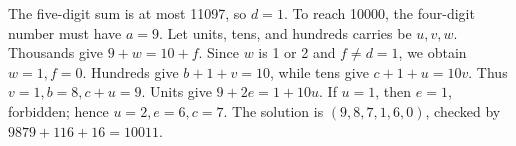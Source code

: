 The five-digit sum is at most 11097, so $d=1$. To reach 10000, the four-digit number must have $a=9$. Let units, tens, and hundreds carries be $u,v,w$. Thousands give $9+w=10+f$. Since $w$ is 1 or 2 and $f\ne d=1$, we obtain $w=1,f=0$. Hundreds give $b+1+v=10$, while tens give $c+1+u=10v$. Thus $v=1,b=8,c+u=9$. Units give $9+2e=1+10u$. If $u=1$, then $e=1$, forbidden; hence $u=2,e=6,c=7$. The solution is $\boxed{(9,8,7,1,6,0)}$, checked by $9879+116+16=10011$.
